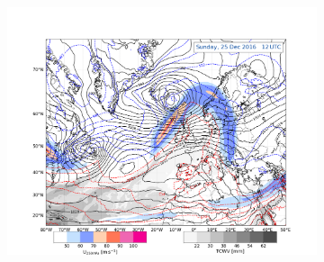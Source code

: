 \begin{figure}[h!]
\begin{subfigure}[b]{0.49\textwidth}
		\caption{}\label{fig:GP23}
	\end{subfigure}
    \begin{subfigure}[b]{\textwidth}
        \includegraphics[trim={4.2cm 0cm 4.3cm 36.8cm},clip,
        width=\textwidth]{./fig_Geopot_Jet/20161225_12}
    \end{subfigure}
\end{figure}
